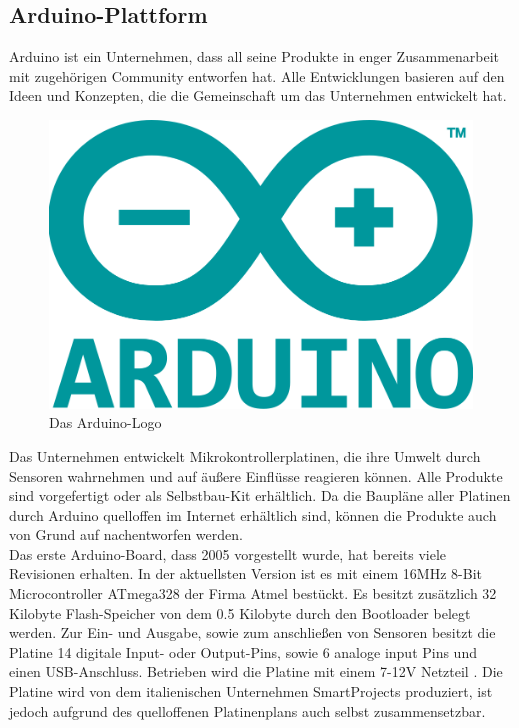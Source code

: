 \subsection{Arduino-Plattform}\label{ss:Arduino}

Arduino ist ein Unternehmen, dass all seine Produkte in enger Zusammenarbeit mit zugehörigen Community entworfen hat. Alle Entwicklungen basieren auf den Ideen und Konzepten, die die Gemeinschaft um das Unternehmen entwickelt hat. 

\begin{figure}[H] 
	\centering
	\includegraphics[scale=0.2]{Bilder/arduino}
	\caption{Das Arduino-Logo\cite{i:arduino}}
	\label{f:tree}
\end{figure}

Das Unternehmen entwickelt Mikrokontrollerplatinen, die ihre Umwelt durch Sensoren wahrnehmen und auf äußere Einflüsse reagieren können. Alle Produkte sind vorgefertigt oder als Selbstbau-Kit erhältlich. Da die Baupläne aller Platinen durch Arduino quelloffen im Internet erhältlich sind, können die Produkte auch von Grund auf nachentworfen werden.\\

Das erste Arduino-Board, dass 2005 vorgestellt wurde, hat bereits viele Revisionen erhalten. In der aktuellsten Version ist es mit einem 16\ac{MHz} 8-Bit Microcontroller ATmega328 der Firma Atmel bestückt. Es besitzt zusätzlich 32 Kilobyte Flash-Speicher von dem 0.5 Kilobyte durch den Bootloader belegt werden. Zur Ein- und Ausgabe, sowie zum anschließen von Sensoren besitzt die Platine 14 digitale Input- oder Output-Pins, sowie 6 analoge input Pins und einen \ac{USB}-Anschluss. Betrieben wird die Platine mit einem 7-12V Netzteil \cite{ws:arduinouno}.
Die Platine wird von dem italienischen Unternehmen SmartProjects produziert, ist jedoch aufgrund des quelloffenen Platinenplans auch selbst zusammensetzbar.\\

